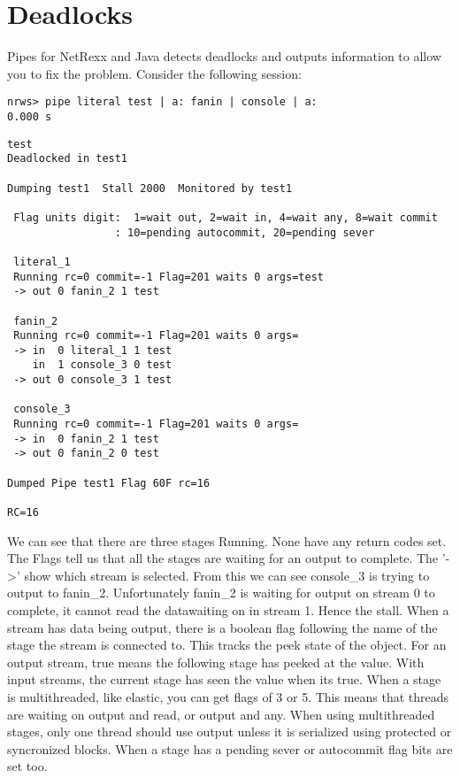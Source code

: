 \chapter{Deadlocks}
Pipes for NetRexx and Java detects deadlocks and outputs information to allow you to fix the problem.  Consider the following session:
\begin{lstlisting}
nrws> pipe literal test | a: fanin | console | a:
0.000 s
\end{lstlisting}
\begin{verbatim}
test
Deadlocked in test1

Dumping test1  Stall 2000  Monitored by test1

 Flag units digit:  1=wait out, 2=wait in, 4=wait any, 8=wait commit
                 : 10=pending autocommit, 20=pending sever

 literal_1
 Running rc=0 commit=-1 Flag=201 waits 0 args=test
 -> out 0 fanin_2 1 test

 fanin_2
 Running rc=0 commit=-1 Flag=201 waits 0 args=
 -> in  0 literal_1 1 test
    in  1 console_3 0 test
 -> out 0 console_3 1 test

 console_3
 Running rc=0 commit=-1 Flag=201 waits 0 args=
 -> in  0 fanin_2 1 test
 -> out 0 fanin_2 0 test

Dumped Pipe test1 Flag 60F rc=16

RC=16
\end{verbatim}

We can see that there are three stages Running.  None have any return codes set.  The Flags tell us that all the stages are waiting for an output to complete.  The '->' show which stream is selected.  From this we can see console\_3 is trying to output to fanin\_2. Unfortunately fanin\_2 is waiting for output on stream 0 to complete, it cannot read the datawaiting on in stream 1.  Hence the stall.
When a stream has data being output, there is a boolean flag following the name of the stage the stream is connected to. This tracks the peek state of the object.  For an output stream, true means the following stage has peeked at the value. With input streams, the current stage has seen the value when its true.
When a stage is multithreaded, like elastic, you can get flags of 3 or 5. This means that threads are waiting on output and read, or output and any. When using multithreaded stages, only one thread should use output unless it is serialized using protected or syncronized blocks.
When a stage has a pending sever or autocommit flag bits are set too.


